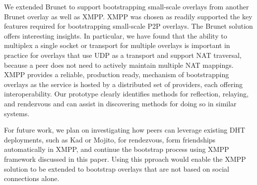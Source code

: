 \documentclass[conference]{IEEEtran}
\begin{document}
We extended Brunet to support bootstrapping small-scale overlays from
another Brunet overlay as well as XMPP.  XMPP was chosen as readily
supported the key features required for bootstrapping small-scale P2P overlays.
The Brunet solution offers interesting insights. In particular, we have
found that the ability to multiplex a single socket or transport for multiple
overlays is important in practice for overlays that use UDP as a transport and
support NAT traversal, because a peer does not need to actively maintain
multiple NAT mappings.  XMPP provides a reliable, production ready, mechanism
of bootstrapping overlays as the service is hosted by a distributed set of
providers, each offering interoperability.  Our prototype clearly identifies
methods for reflection, relaying, and rendezvous and can assist in discovering
methods for doing so in similar systems.

For future work, we plan on investigating how peers can leverage existing DHT
deployments, such as Kad or Mojito, for rendezvous, form friendships
automatically in XMPP, and continue the bootstrap process using XMPP framework
discussed in this paper.  Using this pproach would enable the XMPP solution to
be extended to bootstrap overlays that are not based on social connections
alone.





\suppressfloats
\end{document}
